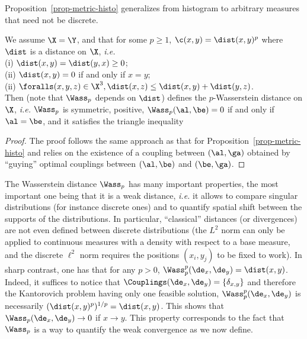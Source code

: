 Proposition~\ref{prop-metric-histo} generalizes from histogram to arbitrary measures that need not be discrete.

\begin{prop}\label{prop-metric-measure}
We assume $\X=\Y$, and that for some $p \geq 1$, $\c(x,y)=\dist(x,y)^p$ where $\dist$ is a distance on $\X$, \emph{i.e.} \\
	\hbox{}\qquad (i) $\dist(x,y) = \dist(y,x) \geq 0$;  \\
	\hbox{}\qquad (ii)  $\dist(x,y)=0$ if and only if $x=y$;  \\
	\hbox{}\qquad (ii)  $\foralls (x,y,z) \in \X^3, \dist(x,z) \leq \dist(x,y)+\dist(y,z)$. \\
Then 
(note that $\Wass_p$ depends on $\dist$) defines the $p$-Wasserstein distance on $\X$, \emph{i.e.} $\Wass_p$ is symmetric, positive, $\Wass_p(\al,\be)=0$ if and only if $\al = \be$, and it satisfies the triangle inequality
\end{prop}

\begin{proof}
The proof follows the same approach as that for Proposition~\ref{prop-metric-histo} and relies on the existence of a coupling between $(\al,\ga)$ obtained by ``guying'' optimal couplings between $(\al,\be)$ and $(\be,\ga)$.
\end{proof}

The Wasserstein distance $\Wass_p$ has many important properties, the most important one being that it is a weak distance, \emph{i.e.} it allows to compare singular distributions (for instance discrete ones) and to quantify spatial shift between the supports of the distributions. 
%
In particular, ``classical'' distances (or divergences) are not even defined between discrete distributions (the $L^2$ norm can only be applied to continuous measures with a density with respect to a base measure, and the discrete $\ell^2$ norm requires the positions $(x_i,y_j)$ to be fixed to work). In sharp contrast, one has that for any $p> 0$, $\Wass_p^p(\de_x,\de_y) = \dist(x,y)$. Indeed, it suffices to notice that $\Couplings(\de_x,\de_y)=\{ \delta_{x,y}\}$ and therefore the Kantorovich problem having only one feasible solution, $\Wass_p^p(\de_x,\de_y)$ is necessarily $(\dist(x,y)^p)^{1/p}=\dist(x,y)$. This shows that $\Wass_p(\de_x,\de_y) \rightarrow 0$ if $x \rightarrow y$. 
%
This property corresponds to the fact that $\Wass_p$ is a way to quantify the weak convergence as we now define. 

